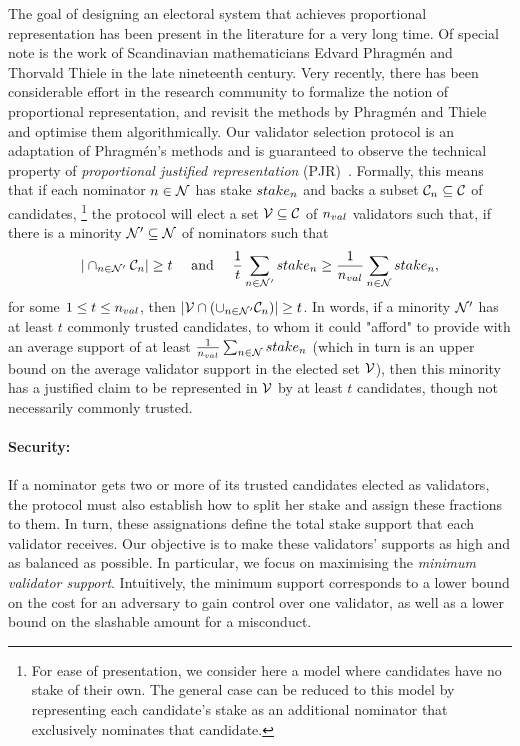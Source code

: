 The goal of designing an electoral system that achieves proportional representation has been present in the literature for a very long time. Of special note is the work of Scandinavian mathematicians Edvard Phragm\'{e}n and Thorvald Thiele in the late nineteenth century. Very recently, there has been considerable effort in the research community to formalize the notion of proportional representation, and revisit the methods by Phragm\'{e}n and Thiele and optimise them algorithmically. 
Our validator selection protocol is an adaptation of Phragm\'{e}n's methods and is guaranteed 
to observe the technical property of \emph{proportional justified representation} (PJR)~\cite{sanchez2017proportional, brill2017phragmen}. 
Formally, this means that if each nominator $n \in \mathcal{N}$ has stake $stake_{n}$ 
and backs a subset $\mathcal{C}_{n}\subseteq \mathcal{C}$ of candidates,%
%
\footnote{For ease of presentation, we consider here a model where candidates have no stake of their own. 
The general case can be reduced to this model by representing each candidate's stake as an additional nominator 
that exclusively nominates that candidate.} %
%
the protocol will elect a set $\mathcal{V}\subseteq \mathcal{C}$ of $n_{val}$ validators such that, 
if there is a minority $\mathcal{N}'\subseteq \mathcal{N}$ of nominators such that %
%
$$|\cap_{n\in \mathcal{N}'} \mathcal{C}_n| \geq t \quad \text{ and } \quad
\frac{1}{t} \sum_{n\in \mathcal{N}'} stake_{n} \geq \frac{1}{n_{val}} \sum_{n\in \mathcal{N}} stake_{n},$$
%
for some $1\leq t\leq n_{val}$, then $|\mathcal{V}\cap (\cup_{n\in\mathcal{N}'} \mathcal{C}_n)| \geq t$.
In words, if a minority $\mathcal{N}'$ has at least $t$ commonly trusted candidates, 
to whom it could "afford" to provide with an average support of at least 
$\frac{1}{n_{val}} \sum_{n\in \mathcal{N}} stake_{n}$ 
(which in turn is an upper bound on the average validator support in the elected set $\mathcal{V}$), 
then this minority has a justified claim to be represented in $\mathcal{V}$ by at least $t$ candidates,  
though not necessarily commonly trusted.

\paragraph{Security:} If a nominator gets two or more of its trusted candidates elected as validators,
the protocol must also establish how to split her stake and assign these fractions to them.
In turn, these assignations define the total stake support that each validator receives.
Our objective is to make these validators' supports as high and as balanced as possible.
In particular, we focus on maximising the \emph{minimum validator support}.
Intuitively, the minimum support corresponds to a lower bound on the cost for an adversary to gain control
over one validator, as well as a lower bound on the slashable amount for a misconduct.

